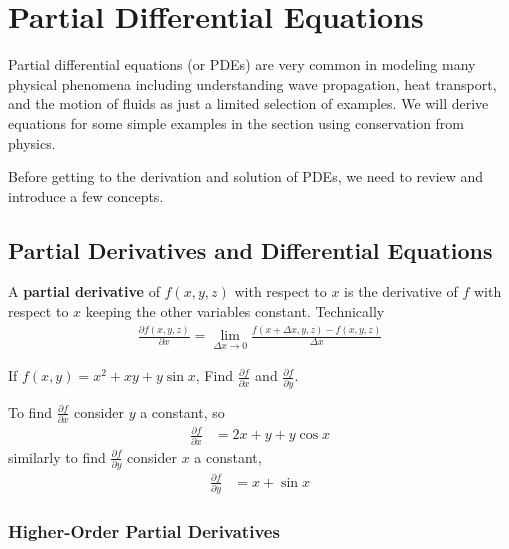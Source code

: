 

\chapter{Partial Differential Equations}

Partial differential equations (or PDEs) are very common in modeling many physical phenomena including understanding wave propagation, heat transport, and the motion of fluids as just a limited selection of examples.   We will derive equations for some simple examples in the section using conservation from physics.

Before getting to the derivation and solution of PDEs, we need to review and introduce a few concepts.

\section{Partial Derivatives and Differential Equations}   \label{sect:part:deriv:diff:eqns}


\begin{definition}
A \textbf{partial derivative} of $f(x,y,z)$ with respect to $x$ is the derivative of $f$ with respect to $x$ keeping the other variables constant.  Technically
%
\begin{align*}
\frac{\partial f(x,y,z)}{\partial x} = \lim_{\Delta x \rightarrow 0} \frac{f(x+\Delta x,y,z)-f(x,y,z)}{\Delta x}
\end{align*}
\end{definition}

\begin{example}
If $f(x,y) = x^2 + xy + y \sin x$, Find $\displaystyle \frac{\partial f}{\partial x}$ and $\displaystyle \frac{\partial f}{\partial y}$.

\solution

To find $\frac{\partial f}{\partial x}$ consider $y$ a constant, so
%
\begin{align*}
\frac{\partial f}{\partial x} & = 2x + y + y \cos x
\end{align*}
similarly to find $\frac{\partial f}{\partial y}$ consider $x$ a constant,
%
\begin{align*}
\frac{\partial f}{\partial y} & = x + \sin x
\end{align*}
\end{example}

\subsection{Higher-Order Partial Derivatives}

